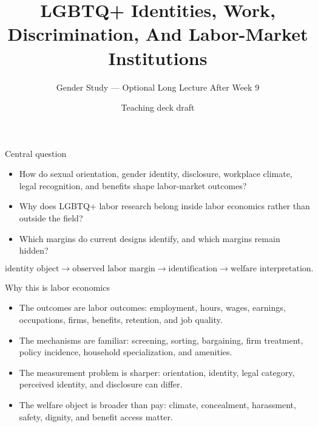 \documentclass[aspectratio=169,11pt]{beamer}
\title{LGBTQ+ Identities, Work, Discrimination, And Labor-Market Institutions}
\subtitle{Gender Study --- Optional Long Lecture After Week 9}
\author{Teaching deck draft}
\date{}
\begin{document}
\begin{frame}
  \titlepage
\end{frame}

\begin{frame}{Central question}
\begin{itemize}
    \item How do sexual orientation, gender identity, disclosure, workplace climate, legal recognition, and benefits shape labor-market outcomes?
    \item Why does LGBTQ+ labor research belong inside labor economics rather than outside the field?
    \item Which margins do current designs identify, and which margins remain hidden?
\end{itemize}
\vspace{0.25cm}
\[
\text{identity object} \rightarrow \text{observed labor margin} \rightarrow
\text{identification} \rightarrow \text{welfare interpretation}.
\]
\end{frame}

\begin{frame}{Why this is labor economics}
\begin{itemize}
    \item The outcomes are labor outcomes: employment, hours, wages, earnings, occupations, firms, benefits, retention, and job quality.
    \item The mechanisms are familiar: screening, sorting, bargaining, firm treatment, policy incidence, household specialization, and amenities.
    \item The measurement problem is sharper: orientation, identity, legal category, perceived identity, and disclosure can differ.
    \item The welfare object is broader than pay: climate, concealment, harassment, safety, dignity, and benefit access matter.
\end{itemize}
\end{frame}
\end{document}
